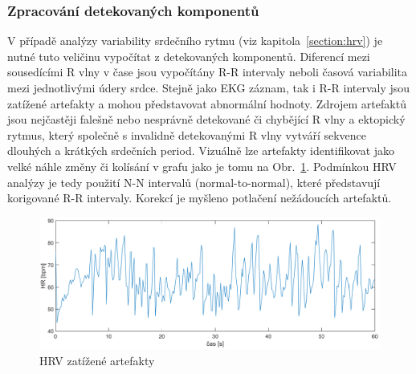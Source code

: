 \subsubsection{Zpracování detekovaných komponentů}
\label{section:components_processing}
V případě analýzy variability srdečního rytmu (viz kapitola~\ref{section:hrv})
je nutné tuto veličinu vypočítat z detekovaných komponentů. Diferencí mezi
sousedícími R vlny v čase jsou vypočítány R-R intervaly neboli časová
variabilita mezi jednotlivými údery srdce. Stejně jako EKG záznam, tak i R-R
intervaly jsou zatížené artefakty a mohou představovat abnormální hodnoty.
Zdrojem artefaktů jsou nejčastěji falešně nebo nesprávně detekované či chybějící
R vlny a ektopický rytmus, který společně s invalidně detekovanými R vlny
vytváří sekvence dlouhých a krátkých srdečních period. Vizuálně lze artefakty
identifikovat jako velké náhle změny či kolísání v grafu jako je tomu na
Obr.~\ref{fig:hrv_artifacts}. Podmínkou HRV analýzy je tedy použití N-N
intervalů (normal-to-normal), které představují korigované R-R intervaly.
Korekcí je myšleno potlačení nežádoucích artefaktů.

\begin{figure}[h]
    \begin{center}
        \includegraphics[width=1\textwidth]{../assets/figures/hrv_artifacts}
        \caption{HRV zatížené artefakty}
        \label{fig:hrv_artifacts}
    \end{center}
\end{figure}

